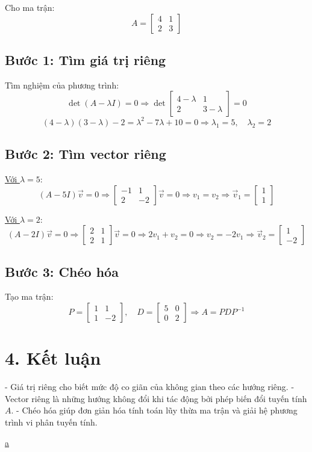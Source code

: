 \documentclass[12pt]{article}
\begin{document}
Cho ma trận:
\[
A = \begin{bmatrix}
4 & 1 \\
2 & 3
\end{bmatrix}
\]

\subsection*{Bước 1: Tìm giá trị riêng}

Tìm nghiệm của phương trình:
\[
\det(A - \lambda I) = 0
\Rightarrow \det \begin{bmatrix}
4 - \lambda & 1 \\
2 & 3 - \lambda
\end{bmatrix} = 0
\]
\[
(4 - \lambda)(3 - \lambda) - 2 = \lambda^2 - 7\lambda + 10 = 0
\Rightarrow \lambda_1 = 5,\quad \lambda_2 = 2
\]

\subsection*{Bước 2: Tìm vector riêng}

\underline{Với \( \lambda = 5 \)}:
\[
(A - 5I)\vec{v} = 0 \Rightarrow 
\begin{bmatrix}
-1 & 1 \\
2 & -2
\end{bmatrix}
\vec{v} = 0 \Rightarrow v_1 = v_2
\Rightarrow \vec{v}_1 = \begin{bmatrix}1 \\ 1\end{bmatrix}
\]

\underline{Với \( \lambda = 2 \)}:
\[
(A - 2I)\vec{v} = 0 \Rightarrow 
\begin{bmatrix}
2 & 1 \\
2 & 1
\end{bmatrix}
\vec{v} = 0 \Rightarrow 2v_1 + v_2 = 0 \Rightarrow v_2 = -2v_1
\Rightarrow \vec{v}_2 = \begin{bmatrix}1 \\ -2\end{bmatrix}
\]

\subsection*{Bước 3: Chéo hóa}

Tạo ma trận:
\[
P = \begin{bmatrix}
1 & 1 \\
1 & -2
\end{bmatrix}, \quad 
D = \begin{bmatrix}
5 & 0 \\
0 & 2
\end{bmatrix}
\Rightarrow A = PDP^{-1}
\]

\section*{4. Kết luận}

- Giá trị riêng cho biết mức độ co giãn của không gian theo các hướng riêng.
- Vector riêng là những hướng không đổi khi tác động bởi phép biến đổi tuyến tính \( A \).
- Chéo hóa giúp đơn giản hóa tính toán lũy thừa ma trận và giải hệ phương trình vi phân tuyến tính.

\href{tratoa.github.io/MAE101/Eigenvalues.html}{a}
\end{document}
